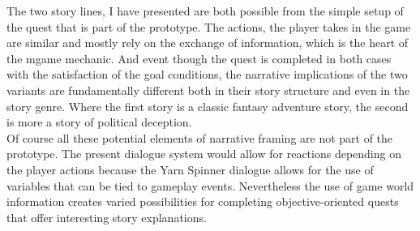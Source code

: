 The two story lines, I have presented are both possible from the simple setup of the quest that is part of the prototype. The actions, the player takes in the game are similar and mostly rely on the exchange of information, which is the heart of the mgame mechanic. And event though the quest is completed in both cases with the satisfaction of the goal conditions, the narrative implications of the two variants are fundamentally different both in their story structure and even in the story genre. Where the first story is a classic fantasy adventure story, the second is more a story of political deception.\\
Of course all these potential elements of narrative framing are not part of the prototype. The present dialogue system would allow for reactions depending on the player actions because the Yarn Spinner dialogue allows for the use of variables that can be tied to gameplay events. Nevertheless the use of game world information creates varied possibilities for completing objective-oriented quests that offer interesting story explanations.\\
